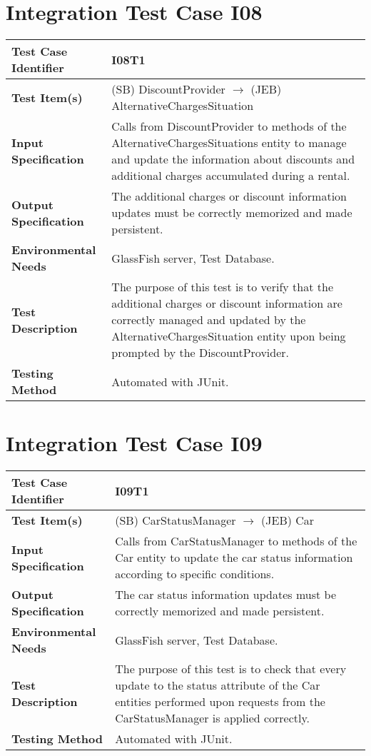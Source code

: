 \section{Integration Test Case I08}

\begin{longtable}{p{} | p{}}
\textbf{Test Case Identifier} & I08T1\\
\hline
\textbf{Test Item(s)} & (SB) DiscountProvider $\rightarrow$ (JEB) AlternativeChargesSituation \\
\hline
\textbf{Input Specification} & Calls from DiscountProvider to methods of the AlternativeChargesSituations entity to manage and update the information about discounts and additional charges accumulated during a rental.\\
\hline
\textbf{Output Specification} & The additional charges or discount information updates must be correctly memorized and made persistent. \\
\hline
\textbf{Environmental Needs} & GlassFish server, Test Database. \\
\hline
\textbf{Test Description} & The purpose of this test is to verify that the additional charges or discount information are correctly managed and updated by the AlternativeChargesSituation entity upon being prompted by the DiscountProvider. \\
\hline
\textbf{Testing Method} & Automated with JUnit. \\
\hline
\end{longtable}

\section{Integration Test Case I09}

\begin{longtable}{p{} | p{}}
\textbf{Test Case Identifier} & I09T1\\
\hline
\textbf{Test Item(s)} & (SB) CarStatusManager $\rightarrow$ (JEB) Car \\
\hline
\textbf{Input Specification} & Calls from CarStatusManager to methods of the Car entity to update the car status information according to specific conditions.\\
\hline
\textbf{Output Specification} & The car status information updates must be correctly memorized and made persistent. \\
\hline
\textbf{Environmental Needs} & GlassFish server, Test Database. \\
\hline
\textbf{Test Description} & The purpose of this test is to check that every update to the status attribute of the Car entities performed upon requests from the CarStatusManager is applied correctly. \\
\hline
\textbf{Testing Method} & Automated with JUnit. \\
\hline
\end{longtable}

